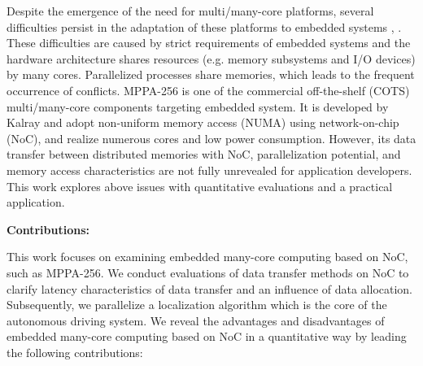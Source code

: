 \documentclass[conference,compsoc]{IEEEtran}
\newcommand{\comment}[1]{}
\begin{document}
Despite the emergence of the need for multi/many-core platforms, several difficulties persist in the adaptation of these platforms to embedded systems \cite{becker2016contention}, \cite{saidi2015shift}.
These difficulties are caused by strict requirements of embedded systems and the hardware architecture shares resources (e.g. memory subsystems and I/O devices) by many cores.
Parallelized processes share memories, which leads to the frequent occurrence of conflicts.
MPPA-256 \cite{de2014time} is one of the commercial off-the-shelf (COTS) multi/many-core components targeting embedded system.
It is developed by Kalray and adopt non-uniform memory access (NUMA) using network-on-chip (NoC), and realize numerous cores and low power consumption.
However, its data transfer between distributed memories with NoC, parallelization potential, and memory access characteristics are not fully unrevealed for application developers.
This work explores above issues with quantitative evaluations and a practical application.


\textbf{Contributions:}
\comment{1-1, 3-3: To be clarified}
This work focuses on examining embedded many-core computing based on NoC, such as MPPA-256.
We conduct evaluations of data transfer methods on NoC to clarify latency characteristics of data transfer and an influence of data allocation.
Subsequently, we parallelize a localization algorithm which is the core of the autonomous driving system.
We reveal the advantages and disadvantages of embedded many-core computing based on NoC in a quantitative way by leading the following contributions:
\end{document}
